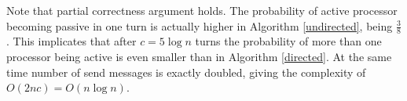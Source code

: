 \documentclass{article}
\begin{document}
Note that partial correctness argument holds. The probability of active processor becoming passive in one turn is actually higher in Algorithm \ref{undirected}, being $\frac{3}{8}$. This implicates that after $c=5\log n$ turns the probability of more than one processor being active is even smaller than in Algorithm \ref{directed}. At the same time number of send messages is exactly doubled, giving the complexity of $O(2nc) = O(n\log n)$.



\end{document}
